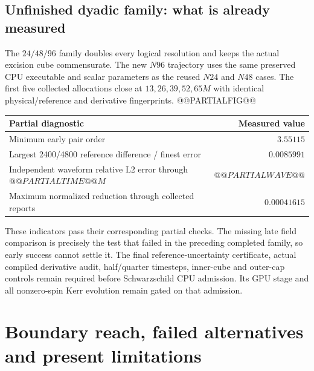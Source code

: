 \documentclass[11pt,letterpaper]{article}
\begin{document}
\clearpage
\subsection{Unfinished dyadic family: what is already measured}
The $24/48/96$ family doubles every logical resolution and keeps the actual excision cube commensurate. The new $N96$ trajectory uses the same preserved CPU executable and scalar parameters as the reused $N24$ and $N48$ cases. The first five collected allocations close at $13,26,39,52,65M$ with identical physical/reference and derivative fingerprints.
@@PARTIALFIG@@

\begin{center}\small
\begin{tabularx}{\linewidth}{@{}Xr@{}}\toprule
Partial diagnostic & Measured value \\\midrule
Minimum early pair order & $3.55115$ \\
Largest 2400/4800 reference difference / finest error & $0.0085991$ \\
Independent waveform relative L2 error through $@@PARTIALTIME@@M$ & $@@PARTIALWAVE@@$ \\
Maximum normalized reduction through collected reports & $0.00041615$ \\\bottomrule
\end{tabularx}\end{center}

These indicators pass their corresponding partial checks. The missing late field comparison is precisely the test that failed in the preceding completed family, so early success cannot settle it. The final reference-uncertainty certificate, actual compiled derivative audit, half/quarter timesteps, inner-cube and outer-cap controls remain required before Schwarzschild CPU admission. Its GPU stage and all nonzero-spin Kerr evolution remain gated on that admission.

\clearpage
\section{Boundary reach, failed alternatives and present limitations}
\end{document}
